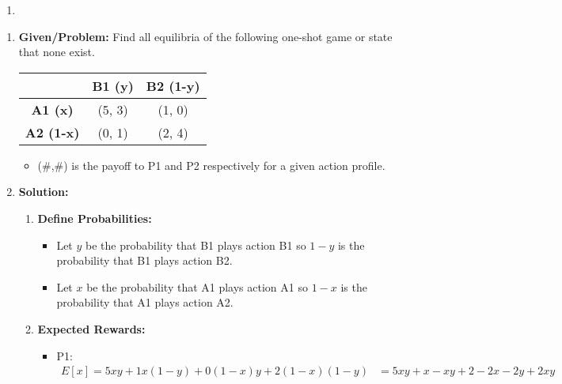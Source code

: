 \begin{example}
    \begin{enumerate}
        \item 
    \end{enumerate}
\end{example}

\begin{example}
    \begin{enumerate}
        \item \textbf{Given/Problem:} Find all equilibria of the following one-shot game or state that none exist.
        \vspace{1em}
            \begin{center}
            \begin{tabular}{ccc}
            \toprule
            & \textbf{B1 (y)} & \textbf{B2 (1-y)} \\
            \midrule
            \textbf{A1 (x)} & (5, 3) & (1, 0) \\
            \textbf{A2 (1-x)} & (0, 1) & (2, 4) \\
            \bottomrule
            \end{tabular}
            \end{center}
        \vspace{1em}
        \begin{itemize}
            \item (\#,\#) is the payoff to P1 and P2 respectively for a given action profile.
        \end{itemize}
        \item \textbf{Solution:}
        \begin{enumerate}
            \item \textbf{Define Probabilities:}
            \begin{itemize}
                \item Let $y$ be the probability that B1 plays action B1 so $1-y$ is the probability that B1 plays action B2.
                \item Let $x$ be the probability that A1 plays action A1 so $1-x$ is the probability that A1 plays action A2.
            \end{itemize}
            \item \textbf{Expected Rewards:} 
            \begin{itemize}
                \item P1: 
                \begin{align*}
                    E[x] = 5xy + 1x(1-y) + 0(1-x)y + 2(1-x)(1-y) &= 5xy + x - xy + 2 - 2x - 2y + 2xy \\

\end{align*}
\end{itemize}
\end{enumerate}
\end{enumerate}
\end{example}
